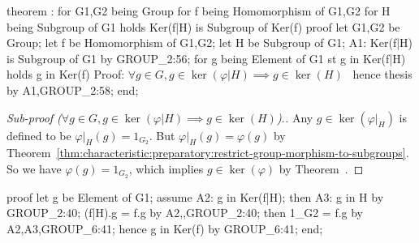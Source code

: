 \nwenddocs{}\endmoddef\nwstartdeflinemarkup{}\nwenddeflinemarkup
theorem :
  for G1,G2 being Group
  for f being Homomorphism of G1,G2
  for H being Subgroup of G1
  holds Ker(f|H) is Subgroup of Ker(f)
proof
  let G1,G2 be Group;
  let f be Homomorphism of G1,G2;
  let H be Subgroup of G1;
  A1: Ker(f|H) is Subgroup of G1 by GROUP_2:56;
  for g being Element of G1 st g in Ker(f|H) holds g in Ker(f)
  \LA{}Proof: $\forall g\in G, g\in\ker(\varphi|H)\implies g\in\ker(H)$~{\nwtagstyle{}}\RA{}
  hence thesis by A1,GROUP_2:58;
end;
\eatline
{}\nwendcode{}\nwdocspar
\begin{proof}[Sub-proof ($\forall g\in G, g\in\ker(\varphi|H)\implies g\in\ker(H)$).]
Any $g\in\ker(\varphi|_{H})$ is defined to be $\varphi|_{H}(g)=1_{G_{2}}$.
But $\varphi|_{H}(g)=\varphi(g)$ by Theorem~\ref{thm:characteristic:preparatory:restrict-group-morphism-to-subgroups}. So we have
$\varphi(g)=1_{G_{2}}$, which implies $g\in\ker(\varphi)$ by Theorem~.
\end{proof}

\nwenddocs{}\endmoddef\nwstartdeflinemarkup{}\nwenddeflinemarkup
proof
  let g be Element of G1;
  assume A2: g in Ker(f|H);
  then A3: g in H by GROUP_2:40;
  (f|H).g = f.g by A2,,GROUP_2:40;
  then 1_G2 = f.g by A2,A3,GROUP_6:41;
  hence g in Ker(f) by GROUP_6:41;
end;
\nwendcode{}\nwdocspar

